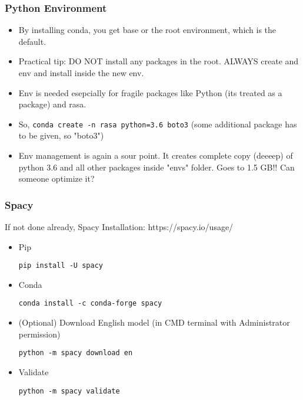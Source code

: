  \begin{frame}[fragile]\frametitle{Python Environment}
\begin{itemize}
\item By installing conda, you get base or the root environment, which is the default.
\item Practical tip: DO NOT install any packages in the root. ALWAYS create and env and install inside the new env.
\item Env is needed esepcially for fragile packages like Python (its treated as a package) and rasa.
\item So, \lstinline|conda create -n rasa python=3.6 boto3| (some additional package has to be given, so "boto3")
\item Env management is again a sour point. It creates complete copy (deeeep) of python 3.6 and all other packages inside "envs" folder. Goes to 1.5 GB!! Can someone optimize it?
\end{itemize}
\end{frame}

 \begin{frame}[fragile]\frametitle{Spacy}
If not done already, Spacy Installation: https://spacy.io/usage/
\begin{itemize}
\item Pip
\begin{lstlisting}
pip install -U spacy
\end{lstlisting}
\item Conda
\begin{lstlisting}
conda install -c conda-forge spacy
\end{lstlisting}
\item (Optional) Download English model (in CMD terminal with Administrator permission)
\begin{lstlisting}
python -m spacy download en
\end{lstlisting}
\item Validate
\begin{lstlisting}
python -m spacy validate
\end{lstlisting}
\end{itemize}
\end{frame}




